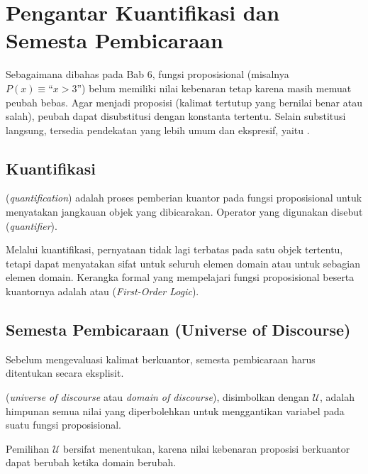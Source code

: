 \section{Pengantar Kuantifikasi dan Semesta Pembicaraan}

Sebagaimana dibahas pada Bab 6, fungsi proposisional (misalnya $P(x) \equiv \text{``}x > 3\text{''}$) belum memiliki nilai kebenaran tetap karena masih memuat peubah bebas. Agar menjadi proposisi (kalimat tertutup yang bernilai benar atau salah), peubah dapat disubstitusi dengan konstanta tertentu. Selain substitusi langsung, tersedia pendekatan yang lebih umum dan ekspresif, yaitu  \cite{rosen2019}.

\subsection{Kuantifikasi}

\begin{definisi}[Kuantifikasi]
 (\textit{quantification}) adalah proses pemberian kuantor pada fungsi proposisional untuk menyatakan jangkauan objek yang dibicarakan. Operator yang digunakan disebut  (\textit{quantifier}).
\end{definisi}

Melalui kuantifikasi, pernyataan tidak lagi terbatas pada satu objek tertentu, tetapi dapat menyatakan sifat untuk seluruh elemen domain atau untuk sebagian elemen domain. Kerangka formal yang mempelajari fungsi proposisional beserta kuantornya adalah  atau  (\textit{First-Order Logic}).

\subsection{Semesta Pembicaraan (Universe of Discourse)}

Sebelum mengevaluasi kalimat berkuantor, semesta pembicaraan harus ditentukan secara eksplisit.

\begin{definisi}
 (\textit{universe of discourse} atau \textit{domain of discourse}), disimbolkan dengan $\mathcal{U}$, adalah himpunan semua nilai yang diperbolehkan untuk menggantikan variabel pada suatu fungsi proposisional.
\end{definisi}

Pemilihan $\mathcal{U}$ bersifat menentukan, karena nilai kebenaran proposisi berkuantor dapat berubah ketika domain berubah.

